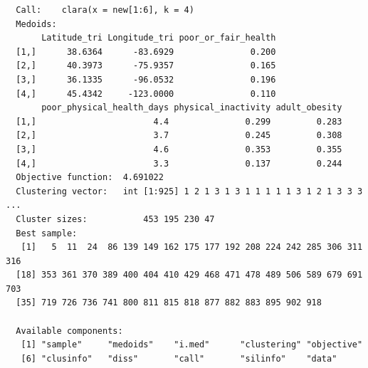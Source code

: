\documentclass[12pt,twoside]{amherstthesis}
\begin{document}
  \begin{Shaded}
  \begin{Highlighting}[]
  \end{Highlighting}
  \end{Shaded}
  
  \begin{verbatim}
  Call:    clara(x = new[1:6], k = 4) 
  Medoids:
       Latitude_tri Longitude_tri poor_or_fair_health
  [1,]      38.6364      -83.6929               0.200
  [2,]      40.3973      -75.9357               0.165
  [3,]      36.1335      -96.0532               0.196
  [4,]      45.4342     -123.0000               0.110
       poor_physical_health_days physical_inactivity adult_obesity
  [1,]                       4.4               0.299         0.283
  [2,]                       3.7               0.245         0.308
  [3,]                       4.6               0.353         0.355
  [4,]                       3.3               0.137         0.244
  Objective function:  4.691022
  Clustering vector:   int [1:925] 1 2 1 3 1 3 1 1 1 1 1 3 1 2 1 3 3 3 ...
  Cluster sizes:           453 195 230 47 
  Best sample:
   [1]   5  11  24  86 139 149 162 175 177 192 208 224 242 285 306 311 316
  [18] 353 361 370 389 400 404 410 429 468 471 478 489 506 589 679 691 703
  [35] 719 726 736 741 800 811 815 818 877 882 883 895 902 918
  
  Available components:
   [1] "sample"     "medoids"    "i.med"      "clustering" "objective" 
   [6] "clusinfo"   "diss"       "call"       "silinfo"    "data"      
  \end{verbatim}
  
  \begin{Shaded}
  \begin{Highlighting}[]
  \end{Highlighting}
  \end{Shaded}
  
\end{document}

